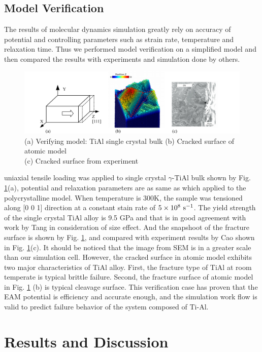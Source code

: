\documentclass[materials,article,submit,moreauthors,pdftex,10pt,a4paper]{Definitions/mdpi}
\begin{document}
 \subsection{Model Verification}
The results of molecular dynamics simulation greatly rely on accuracy of potential and controlling parameters such as strain rate, temperature and relaxation time. Thus we performed model verification on a simplified model and then compared the results with experiments and simulation done by others.
 \begin{figure}[ht]
 	\centering
 	\includegraphics[width=1\linewidth]{img/cold-fracture2}
 	\caption{(a) Verifying model: TiAl single crystal bulk (b) Cracked surface of atomic model\\ (c) Cracked surface from experiment\cite{CHEN2015365}}
 	\label{fig:verify}
 \end{figure}
 uniaxial tensile loading  was applied to single crystal $\gamma$-TiAl bulk shown by Fig. \ref{fig:verify}(a), potential and relaxation parameters are as same as which applied to the polycrystalline model. When temperature is 300K, the sample was tensioned along [0 0 1] direction at a constant stain rate of $5\times10^8\ \rm{s}^{-1}$. The yield strength of the single crystal TiAl alloy is 9.5 GPa  and that is in good agreement with  work by Tang\cite{Tang2010} in consideration of size effect. And the snapshoot of the fracture surface is shown by Fig. \ref{fig:verify}, and compared with experiment results by Cao\cite{CHEN2015365} shown in Fig. \ref{fig:verify}(c). It should be noticed that the image from SEM is in a greater scale than our simulation cell. However, the cracked surface in atomic model exhibits two major characteristics of TiAl alloy. First, the fracture type of TiAl at room temperate is typical brittle failure. Second, the fracture surface  of atomic model in Fig. \ref{fig:verify} (b) is typical cleavage surface. This verification case has proven that the EAM potential is efficiency and accurate enough, and the simulation work flow is valid to predict failure behavior of  the system composed of Ti-Al.
\section{Results and Discussion}\label{section:RD}
\end{document}

